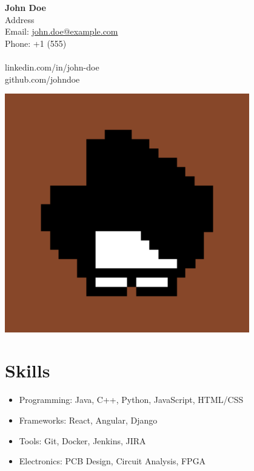 \documentclass[a4paper,12pt]{article} %
\begin{document}
\noindent
\begin{minipage}[c]{0.6\textwidth}
    {\LARGE \bfseries John Doe}\\
    Address\\
    Email: \href{mailto:john.doe@example.com}{john.doe@example.com}\\
    Phone: +1 (555)\\
    \bigskip\\
    linkedin.com/in/john-doe\\
    github.com/johndoe
\end{minipage}
\hfill
\begin{minipage}[c]{0.3\textwidth}
    \includegraphics[width=0.8\textwidth]{../assets/photo.jpg}
\end{minipage}

\section*{Skills}
\begin{itemize}[leftmargin=*]
    \item Programming: Java, C++, Python, JavaScript, HTML/CSS
    \item Frameworks: React, Angular, Django
    \item Tools: Git, Docker, Jenkins, JIRA
    \item Electronics: PCB Design, Circuit Analysis, FPGA
\end{itemize}
\end{document}
